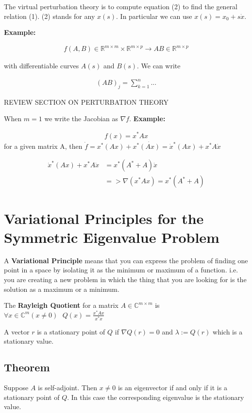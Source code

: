 \documentclass{article}
\newcommand{\n}{\newline}
\begin{document}
\begin{flushleft}
	The virtual perturbation theory is to compute equation (2) to find the general relation (1).  (2) stands for any $x(s)$. In particular we can use $x(s)=x_{0}+s\dot{x}$.  \n
	
	\textbf{Example:\n}
	
	\begin{align*}
	f(A,B)\in\mathbb{R}^{m\times m}\times\mathbb{R}^{m\times p}\rightarrow AB\in\mathbb{R}^{m\times p}
	\end{align*}
	
	with differentiable curves $A(s)$ and $B(s)$.  We can write
	
	\begin{align*}
		(AB)_{j}=\sum_{k=1}^{n}...
	\end{align*}
	
	REVIEW SECTION ON PERTURBATION THEORY\n
	
	When $m=1$ we write the Jacobian as $\nabla f$.  \n
	\textbf{Example:\n}
	
	\begin{align*}
		f(x)=x^{*}Ax
	\end{align*}
	for a given matrix A, then $\dot{f}=x^{*}(Ax)+x^{*}\dot{(Ax)}=\dot{x}^{*}(Ax)+x^{*}A\dot{x}$
	
	\begin{align*}
		\dot{x}^{*}(Ax)+x^{*}A\dot{x}&=x^{*}(A^{*}+A)\dot{x}\\
		&=>\nabla(x^{*}Ax)=x^{*}(A^{*}+A)
	\end{align*}
	
	\section{Variational Principles for the Symmetric Eigenvalue Problem}
	
	A \textbf{Variational Principle} means that you can express the problem of finding one point in a space by isolating it as the minimum or maximum of a function.  i.e. you are creating a new problem in which the thing that you are looking for is the solution as a maximum or a minimum.  \n
	
	The \textbf{Rayleigh Quotient} for a matrix $A\in\mathbb{C}^{m\times m}$ is $\forall x\in\mathbb{C}^{m}(x\neq0)\text{ }Q(x)=\frac{x^{*}Ax}{x^{*}x}$\n
	
	A vector $r$ is a stationary point of $Q$ if $\nabla Q(r)=0$ and $\lambda:=Q(r)$ which is a stationary value.  
	
	\subsection{Theorem}
	
	Suppose $A$ is self-adjoint.  Then $x\neq 0$ is an eigenvector if and only if it is a stationary point of $Q$.  In this case the corresponding eigenvalue is the stationary value.
	\end{flushleft}
\end{document}
